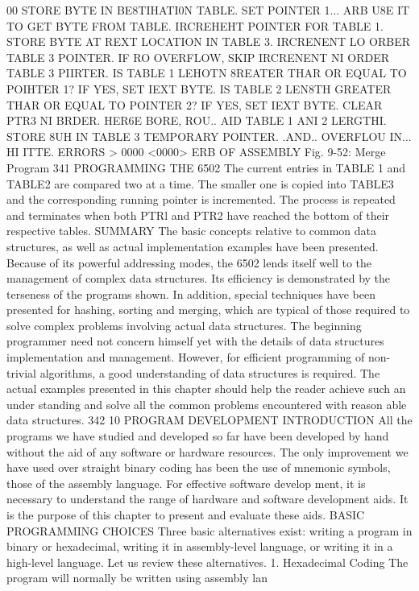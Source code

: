 \documentclass{book}
\begin{document}
{{{{{{{{{{{{{{{{{{{{{{{{{{{{{{{{{{{{{{{{{{{{{{{{{{{{{{{{{{{{{{{{{{{{{{{{{{{{{{{{{{{{{{{{{{{{{{{{{{{{{{{{{{{{{{{{{{{{{{{{00 STORE BYTE IN BE8TIHATI0N TABLE.
{SET POINTER 1...
{ARB U8E IT TO GET BYTE FROM TABLE.
{IRCREHEHT POINTER FOR TABLE 1.
{STORE BYTE AT REXT LOCATION IN TABLE 3.
{IRCRENENT LO ORBER TABLE 3 POINTER.
{IF RO OVERFLOW, SKIP
{IRCRENENT NI ORDER TABLE 3 PIIRTER.
{IS TABLE 1 LEHOTN 8REATER
{THAR OR EQUAL TO POIHTER 1?
{IF YES, SET IEXT BYTE.
{IS TABLE 2 LEN8TH GREATER
{THAR OR EQUAL TO POINTER 2?
{IF YES, SET IEXT BYTE.
{CLEAR PTR3 NI BRDER.
{HER6E BORE, ROU..
{AID TABLE 1 ANI 2 LERGTHI.
{STORE 8UH IN TABLE 3 TEMPORARY POINTER.
.{AND..
{OVERFLOU IN...
{HI ITTE.
ERRORS > 0000 <0000>
ERB OF ASSEMBLY
Fig. 9-52: Merge Program
341
PROGRAMMING THE 6502
The current entries in TABLE 1 and TABLE2 are compared two
at a time. The smaller one is copied into TABLE3 and the corresponding
running pointer is incremented. The process is repeated and terminates
when both PTRl and PTR2 have reached the bottom of their respective
tables.
SUMMARY
The basic concepts relative to common data structures, as well
as actual implementation examples have been presented.
Because of its powerful addressing modes, the 6502 lends itself
well to the management of complex data structures. Its efficiency
is demonstrated by the terseness of the programs shown.
In addition, special techniques have been presented for hashing,
sorting and merging, which are typical of those required to solve
complex problems involving actual data structures.
The beginning programmer need not concern himself yet with
the details of data structures implementation and management.
However, for efficient programming of non-trivial algorithms, a good
understanding of data structures is required. The actual examples
presented in this chapter should help the reader achieve such an under
standing and solve all the common problems encountered with reason
able data structures.
342
10
PROGRAM DEVELOPMENT
INTRODUCTION
All the programs we have studied and developed so far have
been developed by hand without the aid of any software or
hardware resources. The only improvement we have used over
straight binary coding has been the use of mnemonic symbols,
those of the assembly language. For effective software develop
ment, it is necessary to understand the range of hardware and
software development aids. It is the purpose of this chapter to
present and evaluate these aids.
BASIC PROGRAMMING CHOICES
Three basic alternatives exist: writing a program in binary or
hexadecimal, writing it in assembly-level language, or writing it
in a high-level language. Let us review these alternatives.
1. Hexadecimal Coding
The program will normally be written using assembly lan
}}}}}}}}}}}}}}}}}}}}}}}}}}}}}}}}}}}}}}}}}}}}}}}}}}}}}}}}}}}}}}}}}}}}}}}}}}}}}}}}}}}}}}}}}}}}}}}}}}}}}}}}}}}}}}}}}}}}}}}}}}}}}}}}}}}}}}}}}}}}
\end{document}
